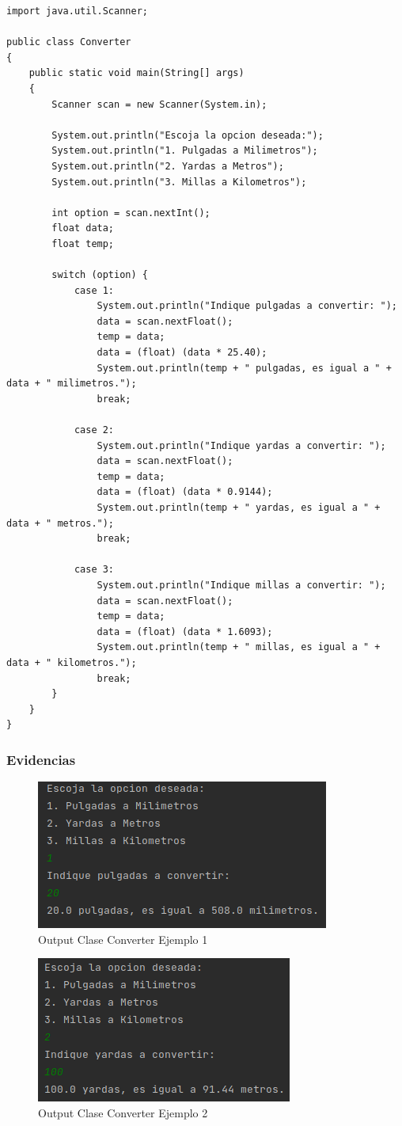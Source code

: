 \documentclass{article}
\begin{document}
\begin{lstlisting}
import java.util.Scanner;

public class Converter
{
	public static void main(String[] args)
	{
		Scanner scan = new Scanner(System.in);
		
		System.out.println("Escoja la opcion deseada:");
		System.out.println("1. Pulgadas a Milimetros");
		System.out.println("2. Yardas a Metros");
		System.out.println("3. Millas a Kilometros");
		
		int option = scan.nextInt();
		float data;
		float temp;
		
		switch (option) {
			case 1:
				System.out.println("Indique pulgadas a convertir: ");
				data = scan.nextFloat();
				temp = data;
				data = (float) (data * 25.40);
				System.out.println(temp + " pulgadas, es igual a " + data + " milimetros.");
				break;
				
			case 2:
				System.out.println("Indique yardas a convertir: ");
				data = scan.nextFloat();
				temp = data;
				data = (float) (data * 0.9144);
				System.out.println(temp + " yardas, es igual a " + data + " metros.");
				break;
				
			case 3:
				System.out.println("Indique millas a convertir: ");
				data = scan.nextFloat();
				temp = data;
				data = (float) (data * 1.6093);
				System.out.println(temp + " millas, es igual a " + data + " kilometros.");
				break;
		}
	}
}
\end{lstlisting}
\newpage

\subsubsection{Evidencias}

\begin{figure}[h]
	\centering
	\includegraphics[scale = 0.9]{images/converter1.png}
	\caption{Output Clase Converter Ejemplo 1}
\end{figure}

\begin{figure}[h]
	\centering
	\includegraphics[scale = 1]{images/converter2.png}
	\caption{Output Clase Converter Ejemplo 2}
\end{figure}
\newpage
\end{document}
